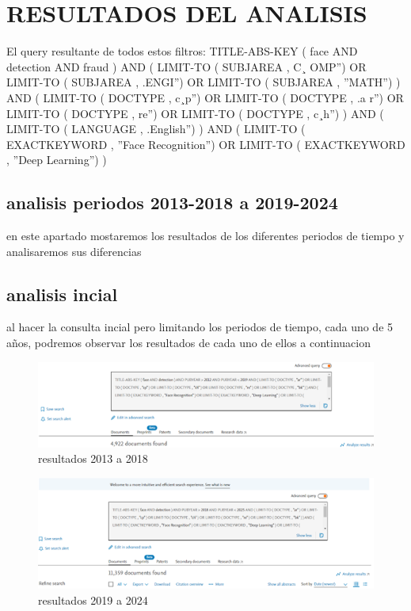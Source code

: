\documentclass[conference]{IEEEtran}
\begin{document}
\section{RESULTADOS DEL ANALISIS}

El query resultante de todos estos filtros:
TITLE-ABS-KEY ( face AND detection AND fraud )
AND ( LIMIT-TO ( SUBJAREA , C¸ OMP”) OR LIMIT-TO (
SUBJAREA , .ENGI”) OR LIMIT-TO ( SUBJAREA , ”MATH”)
) AND ( LIMIT-TO ( DOCTYPE , c¸p”) OR LIMIT-TO (
DOCTYPE , .a
r”) OR LIMIT-TO ( DOCTYPE , re”) OR
LIMIT-TO ( DOCTYPE , c¸h”) ) AND ( LIMIT-TO ( LANGUAGE , .English”) ) AND ( LIMIT-TO ( EXACTKEYWORD
, ”Face Recognition”) OR LIMIT-TO ( EXACTKEYWORD ,
”Deep Learning”) )
\subsection{analisis periodos 2013-2018 a 2019-2024}
en este apartado mostaremos los resultados de los diferentes periodos de tiempo y analisaremos sus diferencias

\subsection{analisis incial}
al hacer la consulta incial pero limitando los periodos de tiempo, cada uno de 5 años, podremos observar los resultados de cada uno de ellos a continuacion
\begin{figure}[H]
    \centering
    \includegraphics[width=1\linewidth]{resultados 2013.png}
    \caption{resultados 2013 a 2018}
    \label{fig:enter-label}
\end{figure}
\begin{figure}[H]
    \centering
    \includegraphics[width=1\linewidth]{resultados 2019.png}
    \caption{resultados 2019 a 2024}
    \label{fig:enter-label}
\end{figure}
\end{document}
